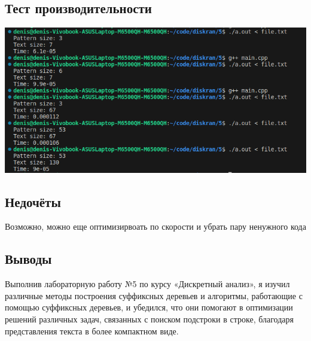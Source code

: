 \documentclass[12pt]{article}
\begin{document}
\subsection*{Тест производительности}

\includegraphics[width=7in]{time.png}

\subsection*{Недочёты}

Возможно, можно еще оптимизирвоать по скорости и убрать пару ненужного кода

\subsection*{Выводы}

Выполнив лабораторную работу №5 по курсу «Дискретный анализ», я изучил
различные методы построения суффиксных деревьев и алгоритмы, работающие с помощью суффиксных деревьев, и убедился, что они помогают в оптимизации
решений различных задач, связанных с поиском подстроки в строке, благодаря представления текста в более компактном виде.
\end{document}
